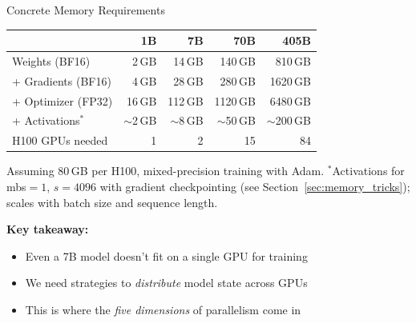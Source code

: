 \begin{frame}{Concrete Memory Requirements}

  \begin{center}
  \begin{tabular}{l r r r r}
    \toprule
    & \textbf{1B} & \textbf{7B} & \textbf{70B} & \textbf{405B} \\
    \midrule
    Weights (BF16)        & 2\,GB  & 14\,GB  & 140\,GB  & 810\,GB \\
    + Gradients (BF16)    & 4\,GB  & 28\,GB  & 280\,GB  & 1620\,GB \\
    + Optimizer (FP32)    & 16\,GB & 112\,GB & 1120\,GB & 6480\,GB \\
    + Activations$^*$     & ${\sim}$2\,GB & ${\sim}$8\,GB & ${\sim}$50\,GB & ${\sim}$200\,GB \\
    \midrule
    H100 GPUs needed      & 1      & 2       & 15       & 84 \\
    \bottomrule
  \end{tabular}
  \end{center}

  \vspace{0.5em}
  {\small Assuming 80\,GB per H100, mixed-precision training with Adam.
  $^*$Activations for mbs${}=1$, $s=4096$ with gradient checkpointing (see Section~\ref{sec:memory_tricks}); scales with batch size and sequence length.}

  \vspace{0.8em}
  \textbf{Key takeaway:}
  \begin{itemize}
    \item Even a 7B model doesn't fit on a single GPU for training
    \item We need strategies to \emph{distribute} model state across GPUs
    \item This is where the \emph{five dimensions} of parallelism come in
  \end{itemize}
\end{frame}


